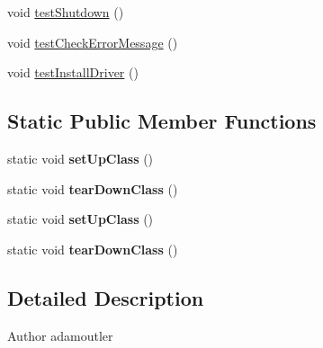 \begin{DoxyCompactItemize}
\item 
void \hyperlink{class_c_a_s_u_a_l_1_1communicationstools_1_1fastboot_1_1_fastboot_tools_test_af09c8983c539ff0f137893e29c3f9b40}{test\-Shutdown} ()
\item 
void \hyperlink{class_c_a_s_u_a_l_1_1communicationstools_1_1fastboot_1_1_fastboot_tools_test_a56d78452ac9672e3c29e75c39cb1c5d2}{test\-Check\-Error\-Message} ()
\item 
void \hyperlink{class_c_a_s_u_a_l_1_1communicationstools_1_1fastboot_1_1_fastboot_tools_test_ae74a592b2b0be9f515db564c0cbde918}{test\-Install\-Driver} ()
\end{DoxyCompactItemize}
\subsection*{Static Public Member Functions}
\begin{DoxyCompactItemize}
\item 
\hypertarget{class_c_a_s_u_a_l_1_1communicationstools_1_1fastboot_1_1_fastboot_tools_test_a360df687855e39c6ab91c25ba4a49bb6}{static void {\bfseries set\-Up\-Class} ()}\label{class_c_a_s_u_a_l_1_1communicationstools_1_1fastboot_1_1_fastboot_tools_test_a360df687855e39c6ab91c25ba4a49bb6}

\item 
\hypertarget{class_c_a_s_u_a_l_1_1communicationstools_1_1fastboot_1_1_fastboot_tools_test_a4bb2461538e8e28812ebfadfd4f00c4f}{static void {\bfseries tear\-Down\-Class} ()}\label{class_c_a_s_u_a_l_1_1communicationstools_1_1fastboot_1_1_fastboot_tools_test_a4bb2461538e8e28812ebfadfd4f00c4f}

\item 
\hypertarget{class_c_a_s_u_a_l_1_1communicationstools_1_1fastboot_1_1_fastboot_tools_test_a360df687855e39c6ab91c25ba4a49bb6}{static void {\bfseries set\-Up\-Class} ()}\label{class_c_a_s_u_a_l_1_1communicationstools_1_1fastboot_1_1_fastboot_tools_test_a360df687855e39c6ab91c25ba4a49bb6}

\item 
\hypertarget{class_c_a_s_u_a_l_1_1communicationstools_1_1fastboot_1_1_fastboot_tools_test_a4bb2461538e8e28812ebfadfd4f00c4f}{static void {\bfseries tear\-Down\-Class} ()}\label{class_c_a_s_u_a_l_1_1communicationstools_1_1fastboot_1_1_fastboot_tools_test_a4bb2461538e8e28812ebfadfd4f00c4f}

\end{DoxyCompactItemize}


\subsection{Detailed Description}
\begin{DoxyAuthor}{Author}
adamoutler 
\end{DoxyAuthor}


